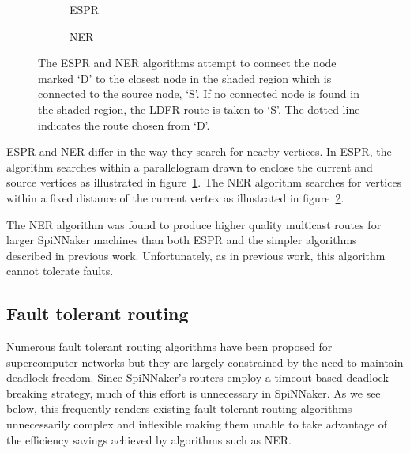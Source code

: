 			\begin{figure}
				\center
				\begin{subfigure}{0.45\linewidth}
					\center
					
					\caption{ESPR}
					\label{fig:search-regions-espr}
				\end{subfigure}
				\begin{subfigure}{0.45\linewidth}
					\center
					
					\caption{NER}
					\label{fig:search-regions-ner}
				\end{subfigure}
				
				\caption[The ESPR and NER multicast routing algorithms.]%
				{The ESPR and NER algorithms attempt to connect the node marked
				`D' to the closest node in the shaded region which is connected to the
				source node, `S'. If no connected node is found in the shaded region, the
				LDFR route is taken to `S'. The dotted line indicates the route chosen
				from `D'.}
				\label{fig:search-regions}
			\end{figure}
			
			ESPR and NER differ in the way they search for nearby vertices. In ESPR,
			the algorithm searches within a parallelogram drawn to enclose the
			current and source vertices as illustrated in
			figure~\ref{fig:search-regions-espr}. The NER algorithm searches for
			vertices within a fixed distance of the current vertex as illustrated in
			figure~\ref{fig:search-regions-ner}.
			
			The NER algorithm was found to produce higher quality multicast routes
			for larger SpiNNaker machines than both ESPR and the simpler algorithms
			described in previous work. Unfortunately, as in previous work, this
			algorithm cannot tolerate faults.
			
		\subsection{Fault tolerant routing}
			
			Numerous fault tolerant routing algorithms have been proposed for
			supercomputer networks but they are largely constrained by the need to
			maintain deadlock freedom. Since SpiNNaker's routers employ a timeout
			based deadlock-breaking strategy, much of this effort is unnecessary in
			SpiNNaker. As we see below, this frequently renders existing fault
			tolerant routing algorithms unnecessarily complex and inflexible making
			them unable to take advantage of the efficiency savings achieved by
			algorithms such as NER.
			
